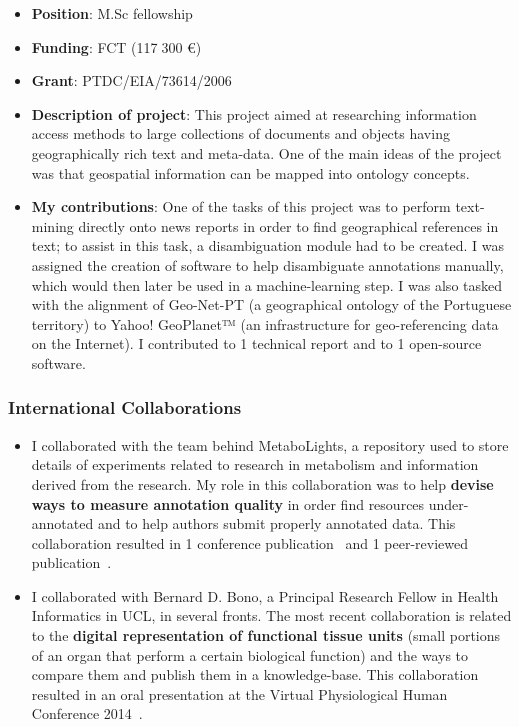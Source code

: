 \begin{itemize}
    \item \textbf{Position}: M.Sc fellowship
    \item \textbf{Funding}: FCT (117$\;$300 €)
    \item \textbf{Grant}: PTDC/EIA/73614/2006
    \item \textbf{Description of project}: This project aimed at researching information access methods to large collections of documents and objects having geographically rich text and meta-data. One of the main ideas of the project was that geospatial information can be mapped into ontology concepts.
    \item \textbf{My contributions}: One of the tasks of this project was to perform text-mining directly onto news reports in order to find geographical references in text; to assist in this task, a disambiguation module had to be created. I was assigned the creation of software to help disambiguate annotations manually, which would then later be used in a machine-learning step. I was also tasked with the alignment of Geo-Net-PT (a geographical ontology of the Portuguese territory) to Yahoo! GeoPlanet™ (an infrastructure for geo-referencing data on the Internet). I contributed to 1 technical report and to 1 open-source software.
\end{itemize}


\subsubsection{International Collaborations}

\begin{itemize}
    \item I collaborated with the team behind MetaboLights, a repository used to store details of experiments related to research in metabolism and information derived from the research. My role in this collaboration was to help \textbf{devise ways to measure annotation quality} in order find resources under-annotated and to help authors submit properly annotated data. This collaboration resulted in 1 conference publication~\autocite{Inacio2017} and 1 peer-reviewed publication~\autocite{Ferreira2017}.
\end{itemize}

\begin{itemize}
    \item I collaborated with Bernard D. Bono, a Principal Research Fellow in Health Informatics in UCL, in several fronts. The most recent collaboration is related to the \textbf{digital representation of functional tissue units} (small portions of an organ that perform a certain biological function) and the ways to compare them and publish them in a knowledge-base. This collaboration resulted in an oral presentation at the Virtual Physiological Human Conference 2014~\autocite{Ferreira2014}.
\end{itemize}

